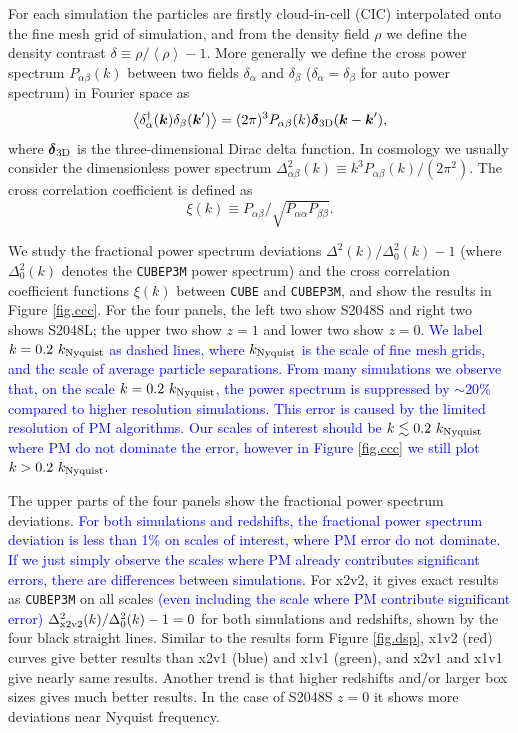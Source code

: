 \documentclass[10pt,twocolumn,preprint]{emulateapj}
\newcommand{\bs}{\boldsymbol}
\newcommand{\tcb}{\textcolor{blue}}
\begin{document}
For each simulation the particles are firstly cloud-in-cell (CIC) interpolated onto the fine mesh grid of simulation, and from the density field $\rho$ we define the density contrast $\delta\equiv \rho/\left\langle \rho \right\rangle-1$. More generally we define the cross power spectrum $P_{\alpha\beta}(k)$ between two fields $\delta_\alpha$ and $\delta_\beta$ ($\delta_\alpha=\delta_\beta$ for auto power spectrum) in Fourier space as
\begin{equation}\label{eq.cps}
	\left\langle \delta_\alpha^\dagger({\bs k})\delta_\beta({\bs k}') \right\rangle=
    (2\pi)^3 P_{\alpha\beta}(k){\bs \delta}_{\rm 3D}({\bs k}-{\bs k}'),
\end{equation}
where ${\bs \delta}_{\rm 3D}$ is the three-dimensional Dirac delta function. In cosmology we usually consider the dimensionless power spectrum $\Delta^2_{\alpha\beta}(k)\equiv k^3 P_{\alpha\beta}(k)/(2\pi^2)$. The cross correlation coefficient is defined as
\begin{equation}\label{eq.ccc}
	\xi(k)\equiv P_{\alpha\beta}/\sqrt{P_{\alpha\alpha}P_{\beta\beta}}.
\end{equation}

We study the fractional power spectrum deviations $\Delta^2(k)/\Delta^2_0(k)-1$ (where $\Delta^2_0(k)$ denotes the {\tt CUBEP3M} power spectrum) and the cross correlation coefficient functions $\xi(k)$ between {\tt CUBE} and {\tt CUBEP3M}, and show the results in Figure \ref{fig.ccc}. For the four panels, the left two show S2048S and right two shows S2048L; the upper two show $z=1$ and lower two show $z=0$. \tcb{We label $k=0.2\ k_{\rm Nyquist}$ as dashed lines, where $k_{\rm Nyquist}$ is the scale of fine mesh grids, and the scale of average particle separations. From many simulations we observe that, on the scale $k=0.2\ k_{\rm Nyquist}$, the power spectrum is suppressed by $\sim 20\%$ compared to higher resolution simulations. This error is caused by the limited resolution of PM algorithms. Our scales of interest should be $k\lesssim 0.2\ k_{\rm Nyquist}$ where PM do not dominate the error, however in Figure \ref{fig.ccc} we still plot $k> 0.2\ k_{\rm Nyquist}$.}

The upper parts of the four panels show the fractional power spectrum deviations. \tcb{For both simulations and redshifts, the fractional power spectrum deviation is less than 1\% on scales of interest, where PM error do not dominate. If we just simply observe the scales where PM already contributes significant errors, there are differences between simulations.} For x2v2, it gives exact results as {\tt CUBEP3M} on all scales \tcb{(even including the scale where PM contribute significant error)} $\Delta^2_{\rm x2v2}(k)/\Delta^2_0(k)-1=0$ for both simulations and redshifts, shown by the four black straight lines. Similar to the results form Figure \ref{fig.dsp}, x1v2 (red) curves give better results than x2v1 (blue) and x1v1 (green), and x2v1 and x1v1 give nearly same results. Another trend is that higher redshifts and/or larger box sizes gives much better results. In the case of S2048S $z=0$ it shows more deviations near Nyquist frequency.
\end{document}
